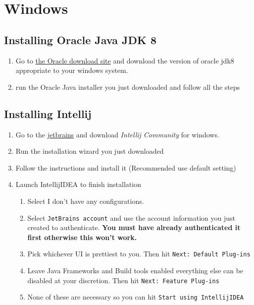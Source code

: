 \documentclass{article}
\begin{document}
\section{Windows}

	\subsection{Installing Oracle Java JDK 8}

		\begin{enumerate}
			\item Go to \href{http://www.oracle.com/technetwork/java/javase/downloads/jdk8-downloads-2133151.html} {the
			Oracle download site} and download the version of oracle jdk8 appropriate to your windows system.

			\item run the Oracle Java installer you just downloaded and follow all the steps
		\end{enumerate}

	\subsection{Installing Intellij}
		\begin{enumerate}
			\item Go to the \href{https://www.jetbrains.com/idea/download/index.html} {jetbrains} and download
			\textit{Intellij Community} for windows.

			\item Run the installation wizard you just downloaded \item Follow the instructions and install it
			(Recommended use default setting)

			\item Launch IntellijIDEA to finish installation
			\begin{enumerate}
				\item Select I don't have any configurations.
				\item Select \texttt{JetBrains account} and use the account information you just created to
				authenticate. \textbf{You must have already authenticated it first otherwise this won't work.}
				\item Pick whichever UI is prettiest to you. Then hit \texttt{Next: Default Plug-ins}
				\item Leave Java Frameworks and Build tools enabled everything else can be disabled at your discretion.
				Then hit \texttt{Next: Feature Plug-ins}
				\item None of these are necessary so you can hit \texttt{Start using IntellijIDEA}
			\end{enumerate}
		\end{enumerate}
\end{document}
